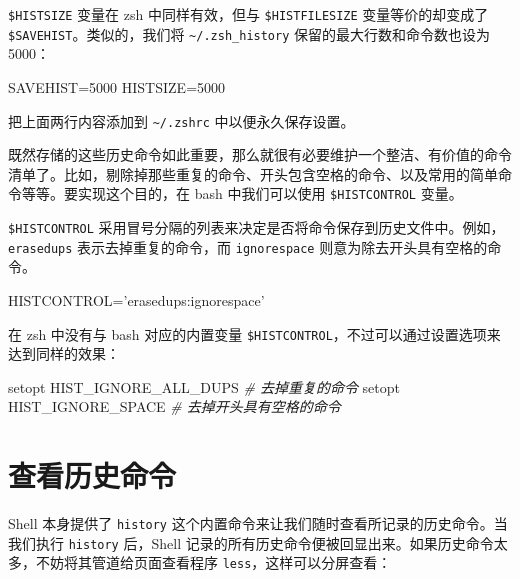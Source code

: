 \documentclass[]{ctexbook}
\newenvironment{Shaded}{\begin{snugshade}}{\end{snugshade}}
\newcommand{\CommentTok}[1]{\textcolor[rgb]{0.56,0.35,0.01}{\textit{#1}}}
\newcommand{\ExtensionTok}[1]{#1}
\newcommand{\NormalTok}[1]{#1}
\newcommand{\StringTok}[1]{\textcolor[rgb]{0.31,0.60,0.02}{#1}}
\newcommand{\VariableTok}[1]{\textcolor[rgb]{0.00,0.00,0.00}{#1}}
\begin{document}
\texttt{\$HISTSIZE} 变量在 zsh 中同样有效，但与 \texttt{\$HISTFILESIZE} 变量等价的却变成了 \texttt{\$SAVEHIST}。类似的，我们将 \texttt{\textasciitilde{}/.zsh\_history} 保留的最大行数和命令数也设为 5000：

\begin{Shaded}
\begin{Highlighting}[]
\VariableTok{SAVEHIST=}\NormalTok{5000}
\VariableTok{HISTSIZE=}\NormalTok{5000}
\end{Highlighting}
\end{Shaded}

把上面两行内容添加到 \texttt{\textasciitilde{}/.zshrc} 中以便永久保存设置。

既然存储的这些历史命令如此重要，那么就很有必要维护一个整洁、有价值的命令清单了。比如，剔除掉那些重复的命令、开头包含空格的命令、以及常用的简单命令等等。要实现这个目的，在 bash 中我们可以使用 \texttt{\$HISTCONTROL} 变量。

\texttt{\$HISTCONTROL} 采用冒号分隔的列表来决定是否将命令保存到历史文件中。例如，\texttt{erasedups} 表示去掉重复的命令，而 \texttt{ignorespace} 则意为除去开头具有空格的命令。

\begin{Shaded}
\begin{Highlighting}[]
\VariableTok{HISTCONTROL=}\StringTok{'erasedups:ignorespace'}
\end{Highlighting}
\end{Shaded}

在 zsh 中没有与 bash 对应的内置变量 \texttt{\$HISTCONTROL}，不过可以通过设置选项来达到同样的效果：

\begin{Shaded}
\begin{Highlighting}[]
\ExtensionTok{setopt}\NormalTok{ HIST_IGNORE_ALL_DUPS }\CommentTok{# 去掉重复的命令}
\ExtensionTok{setopt}\NormalTok{ HIST_IGNORE_SPACE    }\CommentTok{# 去掉开头具有空格的命令}
\end{Highlighting}
\end{Shaded}

\hypertarget{ux67e5ux770bux5386ux53f2ux547dux4ee4}{%
\section{查看历史命令}\label{ux67e5ux770bux5386ux53f2ux547dux4ee4}}

Shell 本身提供了 \texttt{history} 这个内置命令来让我们随时查看所记录的历史命令。当我们执行 \texttt{history} 后，Shell 记录的所有历史命令便被回显出来。如果历史命令太多，不妨将其管道给页面查看程序 \texttt{less}，这样可以分屏查看：
\end{document}
